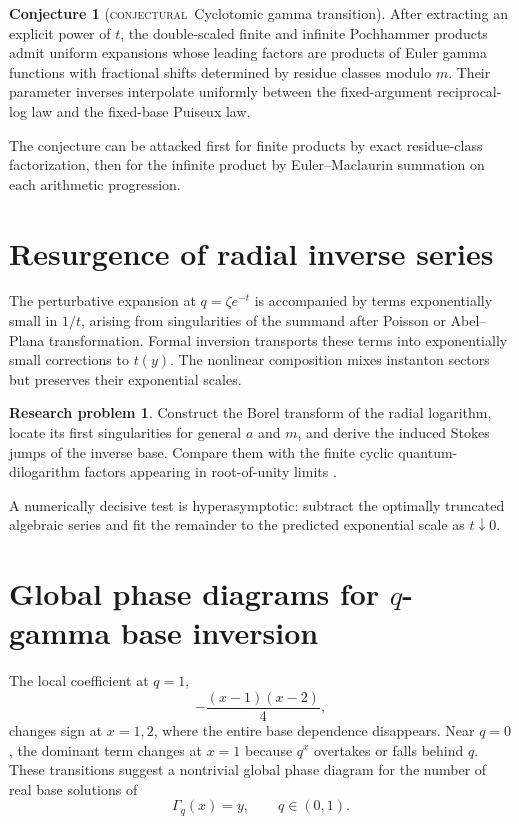 \documentclass[11pt,letterpaper,oneside,openany]{book}
\theoremstyle{definition}
\newtheorem{researchproblem}[theorem]{Research problem}
\newtheorem{conjecture}[theorem]{Conjecture}
\theoremstyle{remark}
\newcommand{\statusconjectural}{\textcolor{conjectureorange}{\textsc{conjectural}}}
\begin{document}
\begin{conjecture}[\statusconjectural\ Cyclotomic gamma transition]
After extracting an explicit power of \(t\), the double-scaled finite and
infinite Pochhammer products admit uniform expansions whose leading factors
are products of Euler gamma functions with fractional shifts determined by
residue classes modulo \(m\).  Their parameter inverses interpolate uniformly
between the fixed-argument reciprocal-log law and the fixed-base Puiseux law.
\end{conjecture}
The conjecture can be attacked first for finite products by exact residue-class
factorization, then for the infinite product by Euler--Maclaurin summation on
each arithmetic progression.

\section{Resurgence of radial inverse series}
The perturbative expansion at \(q=\zeta e^{-t}\) is accompanied by terms
exponentially small in \(1/t\), arising from singularities of the summand after
Poisson or Abel--Plana transformation.  Formal inversion transports these
terms into exponentially small corrections to \(t(y)\).  The nonlinear
composition mixes instanton sectors but preserves their exponential scales.

\begin{researchproblem}
Construct the Borel transform of the radial logarithm, locate its first
singularities for general \(a\) and \(m\), and derive the induced Stokes jumps
of the inverse base.  Compare them with the finite cyclic quantum-dilogarithm
factors appearing in root-of-unity limits \cite{IpYamazaki,GaroufalidisZagier}.
\end{researchproblem}
A numerically decisive test is hyperasymptotic: subtract the optimally
truncated algebraic series and fit the remainder to the predicted exponential
scale as \(t\downarrow0\).

\section{Global phase diagrams for \texorpdfstring{\(q\)}{q}-gamma base inversion}
The local coefficient at \(q=1\),
\[
 -\frac{(x-1)(x-2)}4,
\]
changes sign at \(x=1,2\), where the entire base dependence disappears.  Near
\(q=0\), the dominant term changes at \(x=1\) because \(q^x\) overtakes or
falls behind \(q\).  These transitions suggest a nontrivial global phase
diagram for the number of real base solutions of
\[
 \Gamma_q(x)=y,
 \qquad q\in(0,1).
\]
\end{document}
